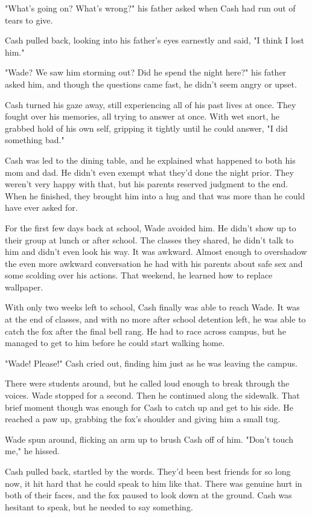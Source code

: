 "What's going on? What's wrong?" his father asked when Cash had run out of tears to give.

Cash pulled back, looking into his father's eyes earnestly and said, "I think I lost him."

"Wade? We saw him storming out? Did he spend the night here?" his father asked him, and though the questions came fast, he didn't seem angry or upset.

Cash turned his gaze away, still experiencing all of his past lives at once. They fought over his memories, all trying to answer at once. With wet snort, he grabbed hold of his own self, gripping it tightly until he could answer, "I did something bad."

Cash was led to the dining table, and he explained what happened to both his mom and dad. He didn't even exempt what they'd done the night prior. They weren't very happy with that, but his parents reserved judgment to the end. When he finished, they brought him into a hug and that was more than he could have ever asked for.

For the first few days back at school, Wade avoided him. He didn't show up to their group at lunch or after school. The classes they shared, he didn't talk to him and didn't even look his way. It was awkward. Almost enough to overshadow the even more awkward conversation he had with his parents about safe sex and some scolding over his actions. That weekend, he learned how to replace wallpaper.

With only two weeks left to school, Cash finally was able to reach Wade. It was at the end of classes, and with no more after school detention left, he was able to catch the fox after the final bell rang. He had to race across campus, but he managed to get to him before he could start walking home.

"Wade! Please!" Cash cried out, finding him just as he was leaving the campus.

There were students around, but he called loud enough to break through the voices. Wade stopped for a second. Then he continued along the sidewalk. That brief moment though was enough for Cash to catch up and get to his side. He reached a paw up, grabbing the fox's shoulder and giving him a small tug.

Wade spun around, flicking an arm up to brush Cash off of him. "Don't touch me," he hissed.

Cash pulled back, startled by the words. They'd been best friends for so long now, it hit hard that he could speak to him like that. There was genuine hurt in both of their faces, and the fox paused to look down at the ground. Cash was hesitant to speak, but he needed to say something.


